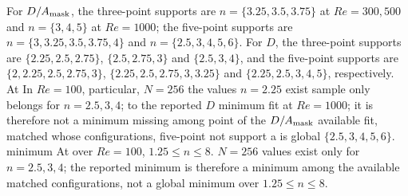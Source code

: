 \documentclass[11pt]{article}
\begin{document}
For $D/A_{\rm mask}$, the three-point supports are
$n=\{3.25,3.5,3.75\}$ at $Re=300,500$ and $n=\{3,4,5\}$ at $Re=1000$; the
five-point supports are $n=\{3,3.25,3.5,3.75,4\}$ and
$n=\{2.5,3,4,5,6\}$. For $D$, the three-point supports are
$\{2.25,2.5,2.75\}$, $\{2.5,2.75,3\}$ and $\{2.5,3,4\}$, and the five-point
supports are $\{2,2.25,2.5,2.75,3\}$, $\{2.25,2.5,2.75,3,3.25\}$ and
$\{2.25,2.5,3,4,5\}$, respectively. \color{revred}At \color{revblue}In\color{black} \color{revred}$Re=100$, \color{revblue}particular,\color{black} \color{revred}$N=256$ \color{revblue}the\color{black} \color{revred}values \color{revblue}$n=2.25$\color{black} \color{revred}exist \color{revblue}sample\color{black} \color{revred}only \color{revblue}belongs\color{black}
\color{revred}for $n=2.5,3,4$; \color{revblue}to\color{black} the \color{revred}reported \color{revblue}$D$\color{black} \color{revred}minimum \color{revblue}fit at $Re=1000$; it\color{black} is \color{revred}therefore \color{revblue}not\color{black} a \color{revred}minimum \color{revblue}missing\color{black} \color{revred}among \color{revblue}point of\color{black} the\color{revblue} $D/A_{\rm mask}$\color{black}
\color{revred}available \color{revblue}fit,\color{black} \color{revred}matched \color{revblue}whose\color{black} \color{revred}configurations, \color{revblue}five-point\color{black} \color{revred}not \color{revblue}support\color{black} \color{revred}a \color{revblue}is\color{black} \color{revred}global \color{revblue}$\{2.5,3,4,5,6\}$.\color{black} \color{revred}minimum \color{revblue}At\color{black} \color{revred}over \color{revblue}$Re=100$,\color{black} \color{revred}$1.25\le n\le8$. \color{revblue}$N=256$\color{black}
\color{revblue}values exist only for $n=2.5,3,4$; the reported minimum is therefore a minimum
\color{black}
\color{revblue}among the available matched configurations, not a global minimum over
\color{black}
\color{revblue}$1.25\le n\le8$.
\color{black}
\end{document}
